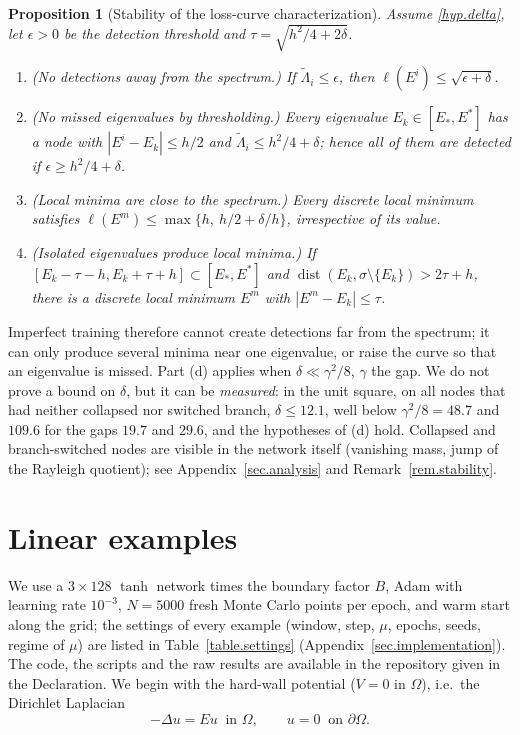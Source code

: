 \documentclass[10pt]{amsart}
\theoremstyle{definition}
\theoremstyle{remark}
\theoremstyle{plain}
\newtheorem{proposition}[theorem]{Proposition}
\DeclareMathOperator{\dist}{dist}
\begin{document}
\begin{proposition}[Stability of the loss-curve characterization]\label{prop.stability}
Assume \eqref{hyp.delta}, let $\epsilon>0$ be the detection threshold and
$\tau=\sqrt{h^2/4+2\delta}$.
\begin{enumerate}
\item[(a)] (No detections away from the spectrum.) If $\tilde\Lambda_i\le\epsilon$, then
$\ell(E^i)\le\sqrt{\epsilon+\delta}$.
\item[(b)] (No missed eigenvalues by thresholding.) Every eigenvalue $E_k\in[E_*,E^*]$ has a node
with $|E^i-E_k|\le h/2$ and $\tilde\Lambda_i\le h^2/4+\delta$; hence all of them are detected if
$\epsilon\ge h^2/4+\delta$.
\item[(c)] (Local minima are close to the spectrum.) Every discrete local minimum satisfies
$\ell(E^m)\le\max\{h,\ h/2+\delta/h\}$, irrespective of its value.
\item[(d)] (Isolated eigenvalues produce local minima.) If
$[E_k-\tau-h,E_k+\tau+h]\subset[E_*,E^*]$ and $\dist(E_k,\sigma\setminus\{E_k\})>2\tau+h$, there is a
discrete local minimum $E^m$ with $|E^m-E_k|\le\tau$.
\end{enumerate}
\end{proposition}

Imperfect training therefore cannot create detections far from the spectrum; it can only produce
several minima near one eigenvalue, or raise the curve so that an eigenvalue is missed. Part (d)
applies when $\delta\ll\gamma^2/8$, $\gamma$ the gap. We do not prove a bound on $\delta$, but it can
be \emph{measured}: in the unit square, on all nodes that had neither collapsed nor switched branch,
$\delta\le12.1$, well below $\gamma^2/8=48.7$ and $109.6$ for the gaps $19.7$ and $29.6$, and the
hypotheses of (d) hold. Collapsed and branch-switched nodes are visible in the network itself (vanishing
mass, jump of the Rayleigh quotient); see Appendix~\ref{sec.analysis} and Remark~\ref{rem.stability}.

\section{Linear examples}\label{sec.examples}

We use a $3\times128$ $\tanh$ network times the boundary factor $B$, Adam with learning rate
$10^{-3}$, $N=5000$ fresh Monte Carlo points per epoch, and warm start along the grid; the settings of
every example (window, step, $\mu$, epochs, seeds, regime of $\mu$) are listed in
Table~\ref{table.settings} (Appendix~\ref{sec.implementation}). The code, the scripts and the raw
results are available in the repository given in the Declaration. We begin with the hard-wall
potential ($V=0$ in $\Omega$), i.e.\ the Dirichlet Laplacian
\begin{equation}\label{eigen2}
-\Delta u = E u \ \text{ in }\Omega,\qquad u=0\ \text{ on }\partial\Omega.
\end{equation}
\end{document}
